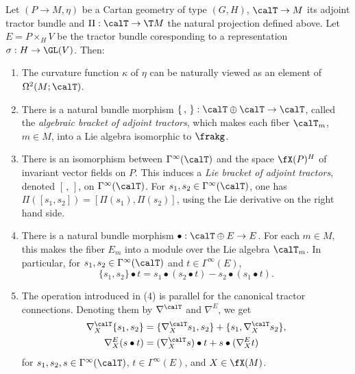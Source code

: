 \begin{prop}\label{prop 1.5.7 Cap}
    Let $(P\to M,\eta)$ be a Cartan geometry of type $(G,H)$, $\calT\to M$ its adjoint tractor bundle and $\Pi:\calT\to \T M$ the natural projection defined above. Let $E=P\times_H V$ be the tractor bundle coresponding to a representation $\sigma:H\to\GL(V)$. Then:
    \begin{enumerate}[label=(\arabic*)]
        \item The curvature function $\kappa$ of $\eta$ can be naturally viewed as an element of $\Omega^2(M;\calT)$.
        \item There is a natural bundle morphism $\{\,,\,\}:\calT\oplus\calT\to \calT$, called the \emph{algebraic bracket of adjoint tractors}, which makes each fiber $\calT_m$, $m\in M$, into a Lie algebra isomorphic to $\frakg$.
        \item There is an isomorphism between $\Gamma^\infty(\calT)$ and the space $\fX(P)^H$ of invariant vector fields on $P$. This induces a \emph{Lie bracket of adjoint tractors}, denoted $[\,,\,]$, on $\Gamma^\infty(\calT)$. For $s_1,s_2\in\Gamma^\infty(\calT)$, one has $\Pi([s_1,s_2])=[\Pi(s_1),\Pi(s_2)]$, using the Lie derivative on the right hand side.
        \item There is a natural bundle morphism $\bullet:\calT\oplus E\to E$. For each $m\in M$, this makes the fiber $E_m$ into a module over the Lie algebra $\calT_m$. In particular, for $s_1,s_2\in\Gamma^\infty(\calT)$ and $t\in \Gamma^\infty(E)$, 
        \[\{s_1,s_2\}\bullet t=s_1\bullet(s_2\bullet t)-s_2\bullet(s_1\bullet t).\]
        \item The operation introduced in (4) is parallel for the canonical tractor connections. Denoting them by $\nabla^\calT$ and $\nabla^E$, we get 
        \begin{align}
            \nabla^\calT_X\{s_1,s_2\}&=\{\nabla^\calT_X s_1,s_2\}+\{s_1,\nabla^\calT_X s_2\},\\
            \nabla^E_X(s\bullet t)&=(\nabla^\calT_X s)\bullet t+s\bullet (\nabla^E_X t)
        \end{align}
        for $s_1,s_2,s\in\Gamma^\infty(\calT)$, $t\in\Gamma^\infty(E)$, and $X\in\fX(M)$.
    \end{enumerate}
\end{prop}
